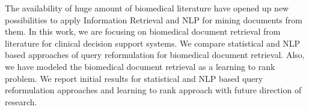 The availability of huge amount of biomedical literature have opened up new possibilities to apply Information Retrieval and NLP for mining documents from them. In this work, we are focusing on biomedical document retrieval from literature for clinical decision support systems. We compare statistical and NLP based approaches of query reformulation for biomedical document retrieval. Also, we have modeled the biomedical document retrieval as a learning to rank problem. We report initial results for statistical and NLP based query reformulation approaches and learning to rank approach with future direction of research.
